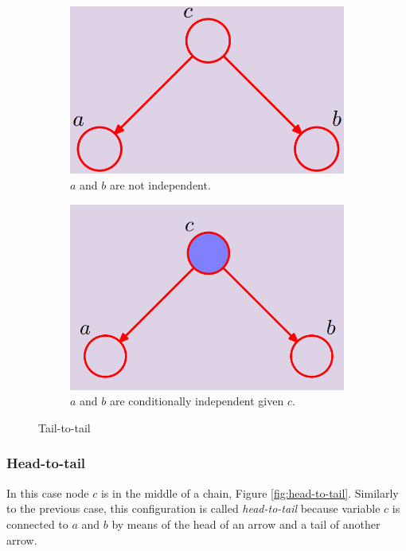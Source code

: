 \begin{figure}[H]
	\centering
	\begin{subfigure}
		[t]{0.49\textwidth}
		\centering
		\includegraphics[width=\linewidth]{
			images/08_BayesianNetworks_tailToTailNoEvidence.png
		}
		\caption{$a$ and $b$ are not independent.}
		\label{fig:unSelectedTailToTail}
	\end{subfigure}
	\hfill
	\begin{subfigure}
		[t]{0.49\textwidth}
		\centering
		\includegraphics[width=\linewidth]{
			images/08_BayesianNetworks_tailToTailEvidence.png
		}
		\caption{$a$ and $b$ are conditionally independent given $c$.}
		\label{fig:selectedTailToTail}
	\end{subfigure}

	\caption{Tail-to-tail}
	\label{fig:tail-to-tail}
\end{figure}

\subsubsection{Head-to-tail}
In this case node $c$ is in the middle of a chain, Figure \ref{fig:head-to-tail}.
Similarly to the previous case, this configuration is called \textit{head-to-tail}
because variable $c$ is connected to $a$ and $b$ by means of the head of an
arrow and a tail of another arrow.
\newline

